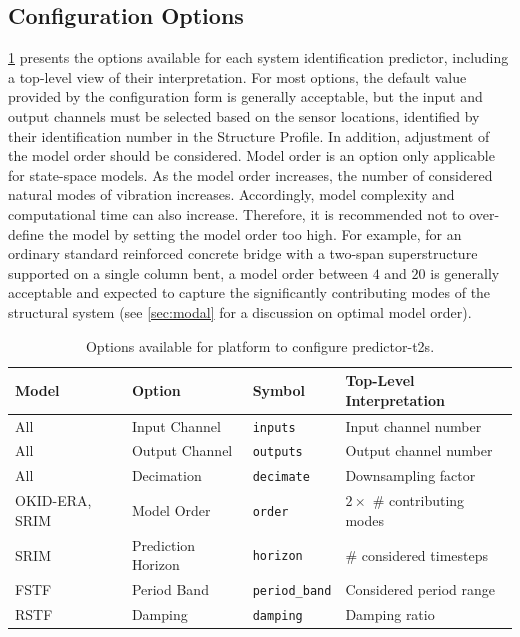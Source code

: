 \subsection{Configuration Options}\label{sec:describe_sysid_configs}

\cref{tab:sysid_options} presents the options available for each system identification predictor, including a top-level view of their interpretation. For most options, the default value provided by the configuration form is generally acceptable, but the input and output channels must be selected based on the sensor locations, identified by their identification number in the Structure Profile. In addition, adjustment of the model order should be considered. Model order is an option only applicable for state-space models. As the model order increases, the number of considered natural modes of vibration increases. Accordingly, model complexity and computational time can also increase. Therefore, it is recommended not to over-define the model by setting the model order too high. For example, for an ordinary standard reinforced concrete bridge with a two-span superstructure supported on a single column bent, a model order between $4$ and $20$ is generally acceptable and expected to capture the significantly contributing modes of the structural system (see \cref{sec:modal} for a discussion on optimal model order).
\begin{table}[h!]
    \centering
    \begin{tabular}{llll}
\toprule
        \textbf{Model} & \textbf{Option} & \textbf{Symbol} & \textbf{Top-Level Interpretation} \\
        \hline
        All & Input Channel & \texttt{inputs} & Input channel number \\
        All & Output Channel & \texttt{outputs} & Output channel number \\
        All & Decimation & \texttt{decimate} & Downsampling factor \\
        OKID-ERA, SRIM & Model Order & \texttt{order} & $2 \times$ \# contributing modes \\
        SRIM & Prediction Horizon & \texttt{horizon} & \# considered timesteps \\
        FSTF & Period Band & \texttt{period\_band} & Considered period range \\
        RSTF & Damping & \texttt{damping} & Damping ratio \\
\bottomrule
    \end{tabular}
    \caption{Options available for \BRACE{} platform to configure \glspl{predictor-t2}.}
    \label{tab:sysid_options}
\end{table}

